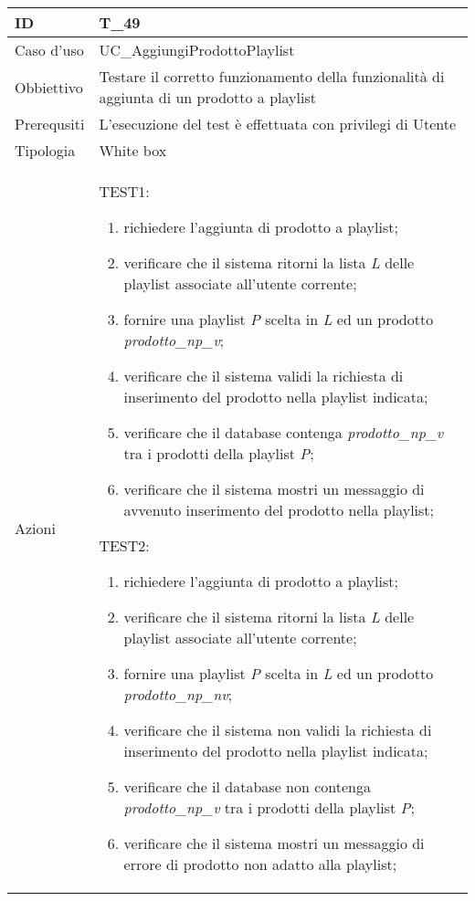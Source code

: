 \begin{table}[hb]
    \centering
    \begin{tabular}{ |p{2cm}|p{10cm}|  }
        \hline
        ID          & T\_49                                                                              \\\hline
        Caso d'uso  & UC\_AggiungiProdottoPlaylist                                                           \\\hline
        Obbiettivo  & Testare il corretto funzionamento della funzionalità di aggiunta di un prodotto a playlist \\\hline
        Prerequsiti & L'esecuzione del test è effettuata con privilegi di Utente                         \\\hline
        Tipologia   & White box                                                                          \\\hline
        Azioni      &
        TEST1:
        \begin{enumerate}[nosep, topsep=0pt]
            \item richiedere l'aggiunta di prodotto a playlist;
            \item verificare che il sistema ritorni la lista \emph{L} delle playlist associate all'utente corrente;
            \item fornire una playlist \emph{P} scelta in \emph{L} ed un prodotto \emph{prodotto\_np\_v};
            \item verificare che il sistema validi la richiesta di inserimento del prodotto nella playlist indicata;
            \item verificare che il database contenga \emph{prodotto\_np\_v} tra i prodotti della playlist \emph{P};
            \item verificare che il sistema mostri un messaggio di avvenuto inserimento del prodotto nella playlist;
        \end{enumerate}
        \vspace{0.5cm} TEST2:
        \begin{enumerate}[nosep, topsep=0pt]
            \item richiedere l'aggiunta di prodotto a playlist;
            \item verificare che il sistema ritorni la lista \emph{L} delle playlist associate all'utente corrente;
            \item fornire una playlist \emph{P} scelta in \emph{L} ed un prodotto \emph{prodotto\_np\_nv};
            \item verificare che il sistema non validi la richiesta di inserimento del prodotto nella playlist indicata;
            \item verificare che il database non contenga \emph{prodotto\_np\_v} tra i prodotti della playlist \emph{P};
            \item verificare che il sistema mostri un messaggio di errore di prodotto non adatto alla playlist;
        \end{enumerate}
        \\\hline
    \end{tabular}
\end{table}

